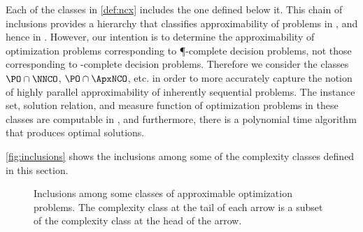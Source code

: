 \documentclass[]{article}
\begin{document}
Each of the classes in \autoref{def:ncx} includes the one defined below it.
This chain of inclusions provides a hierarchy that classifies approximability of problems in \NNCO{}, and hence in \NPO.
However, our intention is to determine the approximability of optimization problems corresponding to \P-complete decision problems, not those corresponding to \NP-complete decision problems.
Therefore we consider the classes $\PO \cap \NNCO$, $\PO \cap \ApxNCO$, etc. in order to more accurately capture the notion of highly parallel approximability of inherently sequential problems.
The instance set, solution relation, and measure function of optimization problems in these classes are computable in \NC{}, and furthermore, there is a polynomial time algorithm that produces optimal solutions.

\autoref{fig:inclusions} shows the inclusions among some of the complexity classes defined in this section.
\begin{figure}
  \caption{%
    Inclusions among some classes of approximable optimization problems.
    The complexity class at the tail of each arrow is a subset of the complexity class at the head of the arrow.
    \label{fig:inclusions}}
  \begin{center}
  \end{center}
\end{figure}
\end{document}
